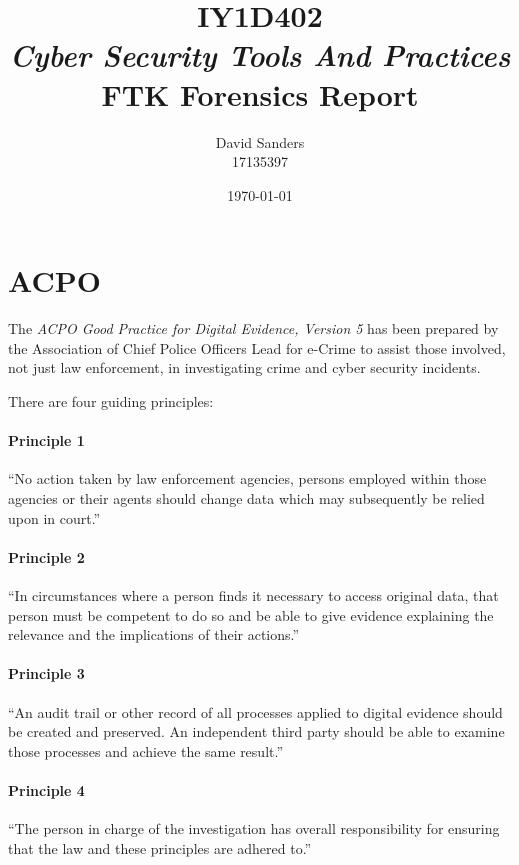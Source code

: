 \documentclass[12pt]{article}
\title{IY1D402{\textit{\small \\Cyber Security Tools And Practices}}\\FTK Forensics Report}
\author{David Sanders\\{\LARGE 17135397}}
\date{\today}
\begin{document}
\maketitle
\pagebreak
\tableofcontents

\pagebreak
\section{ACPO}
The \textit{ACPO Good Practice for Digital Evidence, Version 5} has been prepared by the Association of Chief Police Officers Lead for e-Crime to assist those involved, not just law enforcement, in investigating crime and cyber security incidents.

There are four guiding principles:
\paragraph{Principle 1}
``No action taken by law enforcement agencies, persons employed within those agencies or their agents should change data which may subsequently be relied upon in court.''
\paragraph{Principle 2}
``In circumstances where a person finds it necessary to access original data, that person must be competent to do so and be able to give evidence explaining the relevance and the implications of their actions.''
\paragraph{Principle 3}
``An audit trail or other record of all processes applied to digital evidence should be created and preserved. An independent third party should be able to examine those processes and achieve the same result.''
\paragraph{Principle 4}
``The person in charge of the investigation has overall responsibility for ensuring that the law and these principles are adhered to.''\\
\end{document}
